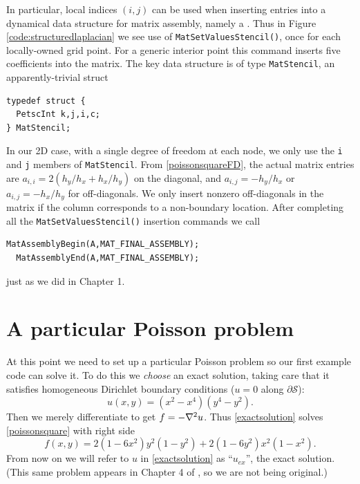 In particular, local indices $(i,j)$ can be used when inserting entries into a dynamical data structure for matrix assembly, namely a \pMat.  Thus in Figure \ref{code:structuredlaplacian} we see use of \texttt{MatSetValuesStencil()}, once for each locally-owned grid point.  For a generic interior point this command inserts five coefficients into the matrix.  The key data structure is of type \texttt{MatStencil}, an apparently-trivial struct
\begin{Verbatim}[fontsize=\small]
typedef struct {
  PetscInt k,j,i,c;
} MatStencil;
\end{Verbatim}
In our 2D case, with a single degree of freedom at each node, we only use the \texttt{i} and \texttt{j} members of \texttt{MatStencil}.  From \eqref{poissonsquareFD}, the actual matrix entries are $a_{i,i} = 2\left(h_y/h_x + h_x/h_y\right)$ on the diagonal, and $a_{i,j} = -h_y/h_x$ or $a_{i,j} = -h_x/h_y$ for off-diagonals.  We only insert nonzero off-diagonals in the matrix if the column corresponds to a non-boundary location.  After completing all the \texttt{MatSetValuesStencil()} insertion commands we call 
\begin{Verbatim}[fontsize=\small]
  MatAssemblyBegin(A,MAT_FINAL_ASSEMBLY);
  MatAssemblyEnd(A,MAT_FINAL_ASSEMBLY);
\end{Verbatim}
just as we did in Chapter 1.


\section{A particular Poisson problem}

At this point we need to set up a particular Poisson problem so our first example code can solve it.  To do this we \emph{choose} an exact solution, taking care that it satisfies homogeneous Dirichlet boundary conditions ($u=0$ along $\partial \mathcal{S}$):
\begin{equation}
u(x,y) = (x^2 - x^4) (y^4 - y^2). \label{exactsolution}
\end{equation}
Then we merely differentiate to get $f = -\nabla^2 u$.  Thus \eqref{exactsolution} solves \eqref{poissonsquare} with right side
\begin{equation}
f(x,y) = 2 (1 - 6 x^2) y^2 (1 - y^2) + 2 (1 - 6 y^2) x^2 (1 - x^2).\label{manufacturedf}
\end{equation}
From now on we will refer to $u$ in \eqref{exactsolution} as ``$u_{ex}$'', the exact solution.  (This same problem appears in Chapter 4 of \citep{Briggsetal2000}, so we are not being original.) %


